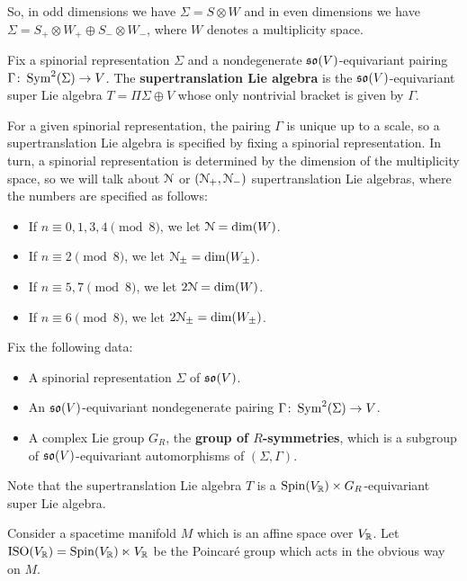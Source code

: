 \documentclass[10pt, oneside]{article}
\begin{document}
So, in odd dimensions we have $\Sigma=S\otimes W$ and in even dimensions we have $\Sigma=S_+\otimes W_+\oplus S_-\otimes W_-$, where $W$ denotes a multiplicity space.

\begin{definition}
Fix a spinorial representation $\Sigma$ and a nondegenerate $\mathfrak{so}(V)$-equivariant pairing $\Gamma\colon \operatorname{Sym}^2(\Sigma)\rightarrow V$. The {\bf supertranslation Lie algebra} is the $\mathfrak{so}(V)$-equivariant super Lie algebra $T=\Pi\Sigma\oplus V$ whose only nontrivial bracket is given by $\Gamma$.
\end{definition}

For a given spinorial representation, the pairing $\Gamma$ is unique up to a scale, so a supertranslation Lie algebra is specified by fixing a spinorial representation. In turn, a spinorial representation is determined by the dimension of the multiplicity space, so we will talk about $\mathcal{N}$ or $(\mathcal{N}_+, \mathcal{N}_-)$ supertranslation Lie algebras, where the numbers are specified as follows:
\begin{itemize}
\item If $n\equiv 0, 1, 3, 4\pmod 8$, we let $\mathcal{N} = \dim(W)$.

\item If $n\equiv 2 \pmod 8$, we let $\mathcal{N}_{\pm}=\dim(W_{\pm})$.

\item If $n\equiv 5, 7\pmod 8$, we let $2\mathcal{N} = \dim(W)$.

\item If $n\equiv 6\pmod 8$, we let $2\mathcal{N}_{\pm} = \dim(W_{\pm})$.
\end{itemize}

Fix the following data:
\begin{itemize}
\item A spinorial representation $\Sigma$ of $\mathfrak{so}(V)$.

\item An $\mathfrak{so}(V)$-equivariant nondegenerate pairing $\Gamma\colon \operatorname{Sym}^2(\Sigma)\rightarrow V$.

\item A complex Lie group $G_R$, the {\bf group of $R$-symmetries}, which is a subgroup of $\mathfrak{so}(V)$-equivariant automorphisms of $(\Sigma, \Gamma)$.
\end{itemize}

Note that the supertranslation Lie algebra $T$ is a $\mathrm{Spin}(V_\mathbb R)\times G_R$-equivariant super Lie algebra.

Consider a spacetime manifold $M$ which is an affine space over $V_\mathbb R$. Let $\mathrm{ISO}(V_\mathbb R) = \mathrm{Spin}(V_\mathbb R)\ltimes V_\mathbb R$ be the Poincar\'{e} group which acts in the obvious way on $M$.
\end{document}
